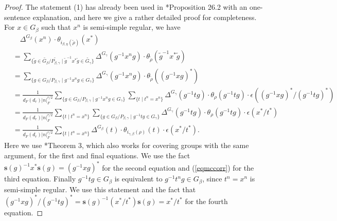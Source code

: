 \documentclass{amsart}
\numberwithin{equation}{section}
\newcommand{\abs}[1]{\left|#1\right|_{F}}
\newcommand{\dF}[1]{d_{F}(#1)}
\newcommand{\bs}[1]{\boldsymbol{#1}}
\newcommand{\wt}[1]{\widetilde{#1}}
\begin{document}
	\begin{proof}
		
		The statement (1) has already been used in \cite{flicker1986metaplectic}*{Proposition 26.2} with an one-sentence explanation, and here we give a rather detailed proof for completeness. For $x\in G_{\beta}$ such that $x^{n}$ is semi-simple regular, we have
		\begin{align*}
			&\quad \Delta^{G_{\beta}}(x^{n})\cdot\theta_{i_{\beta,\eta}(\wt{\rho})}(x^{*})\\
			&=\sum_{\{\wt{g}\in\wt{G_{\beta}}/\wt{P_{\beta,\gamma}}\mid\wt{g}^{-1}x^{*}\wt{g}\in\wt{G_{\gamma}}\}}\Delta^{G_{\gamma}}(g^{-1}x^{n}g)\cdot\theta_{\wt{\rho}}(\wt{g}^{-1}x^{*}\wt{g})\\
			&=\sum_{\{g\in G_{\beta}/P_{\beta,\gamma}\mid g^{-1}x^{n}g\in G_{\gamma}\}}\Delta^{G_{\gamma}}(g^{-1}x^{n}g)\cdot\theta_{\wt{\rho}}((g^{-1}xg)^{*})\\
			&=\frac{1}{\dF{d_{r}}\abs{n}^{r/2}}\sum_{\{g\in G_{\beta}/P_{\beta,\gamma}\mid g^{-1}x^{n}g\in G_{\gamma}\}}\sum_{\{t\mid t^{n}=x^{n}\}}\Delta^{G_{\gamma}}(g^{-1}tg)\cdot\theta_{\rho}(g^{-1}tg)\cdot\epsilon((g^{-1}xg)^{*}/(g^{-1}tg)^{*})\\
			&=\frac{1}{\dF{d_{r}}\abs{n}^{r/2}}\sum_{\{t\mid t^{n}=x^{n}\}}\sum_{\{g\in G_{\beta}/P_{\beta,\gamma}\mid g^{-1}tg\in G_{\gamma}\}}\Delta^{G_{\gamma}}(g^{-1}tg)\cdot\theta_{\rho}(g^{-1}tg)\cdot\epsilon(x^{*}/t^{*})\\
			&=\frac{1}{\dF{d_{r}}\abs{n}^{r/2}}\sum_{\{t\mid t^{n}=x^{n}\}}\Delta^{G_{\beta}}(t)\cdot\theta_{i_{\gamma,\beta}(\rho)}(t)\cdot\epsilon(x^{*}/t^{*}).
		\end{align*}
		Here we use \cite{van1972computation}*{Theorem 3}, which also works for covering groups with the same argument, for the first and final equations. We use the fact $\bs{s}(g)^{-1}x^{*}\bs{s}(g)=(g^{-1}xg)^{*}$ for the second equation and (\ref{eqmccorr}) for the third equation. Finally $ g^{-1}tg\in G_{\beta}$ is equivalent to  $g^{-1}t^{n}g\in G_{\beta}$, since $t^{n}=x^{n}$ is semi-simple regular. We use this statement and the fact that $(g^{-1}xg)^{*}/(g^{-1}tg)^{*}=\bs{s}(g)^{-1}(x^{*}/t^{*})\bs{s}(g)=x^{*}/t^{*}$ for the fourth equation. 
		

\end{proof}
\end{document}
